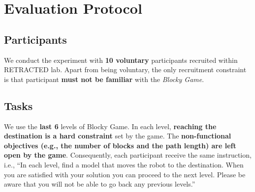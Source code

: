 \documentclass[11pt,a4paper]{article}
\begin{document}
\section{Evaluation Protocol}


\subsection{Participants}

We conduct the experiment with \textbf{10 voluntary} participants recruited within RETRACTED lab.
Apart from being voluntary, the only recruitment constraint is that participant \textbf{must not be familiar} with the \textit{Blocky Game}.



\subsection{Tasks} 

We use the \textbf{last 6} levels of Blocky Game. In each level, \textbf{reaching the destination is a hard constraint} set by the game. 
The \textbf{non-functional objectives (e.g., the number of blocks and the path length) are left open by the game}. 
Consequently, each participant receive the same instruction, i.e., ``In each level, find a model that moves the robot to the destination. When you are satisfied with your solution you can proceed to the next level. Please be aware that you will not be able to go back any previous levels.''
\end{document}
